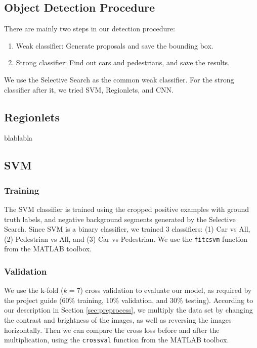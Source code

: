 \documentclass{article} %
\begin{document}
\subsection{Object Detection Procedure}

There are mainly two steps in our detection procedure: 
\begin{enumerate}[Step 1]
    \item Weak classifier: Generate proposals and save the bounding box.
    \item Strong classifier: Find out cars and pedestrians, and save the results.
\end{enumerate}

We use the Selective Search \cite{van2011segmentation} as the common weak classifier. For the strong classifier after it, we tried SVM, Regionlets, and CNN.

\subsection{Regionlets}

blablabla

\subsection{SVM}

\subsubsection{Training}

The SVM classifier is trained using the cropped positive examples with ground truth labels, and negative background segments generated by the Selective Search. Since SVM is a binary classifier, we trained 3 classifiers: (1) Car vs All, (2) Pedestrian vs All, and (3) Car vs Pedestrian. We use the \texttt{fitcsvm} function from the MATLAB toolbox.

\subsubsection{Validation}

We use the k-fold ($k=7$) cross validation to evaluate our model, as required by the project guide ($60\%$ training, $10\%$ validation, and $30\%$ testing). According to our description in Section \ref{sec:preprocess}, we multiply the data set by changing the contrast and brightness of the images, as well as reversing the images horizontally. Then we can compare the cross loss before and after the multiplication, using the \texttt{crossval} function from the MATLAB toolbox.
\end{document}
